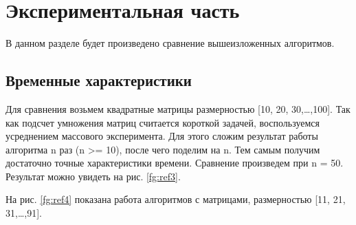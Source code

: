 \chapter{Экспериментальная часть}

В данном разделе будет произведено сравнение вышеизложенных алгоритмов.

\section{Временные характеристики}

Для сравнения возьмем квадратные матрицы размерностью [10, 20, 30,\dots,100]. 
Так как подсчет умножения матриц считается короткой задачей, воспользуемся усреднением массового эксперимента. 
Для этого сложим результат работы алгоритма n раз (n >= 10), после чего поделим на n. 
Тем самым получим достаточно точные характеристики времени. 
Сравнение произведем при n = 50.
Результат можно увидеть на рис. \ref{fg:ref3}. 

\begin{figure}[ht!]
\end{figure}

На рис. \ref{fg:ref4} показана работа алгоритмов с матрицами, размерностью [11, 21, 31,\dots,91].

